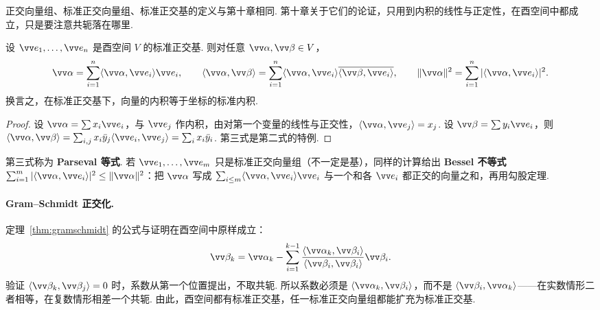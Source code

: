 	正交向量组、标准正交向量组、标准正交基的定义与第十章相同. 第十章关于它们的论证，只用到内积的线性与正定性，在酉空间中都成立，只是要注意共轭落在哪里.
	
	\begin{proposition}\label{prop:unitarycoord}
		设 $\vv e_1,\ldots,\vv e_n$ 是酉空间 $V$ 的标准正交基. 则对任意 $\vv\alpha,\vv\beta\in V$，
		\[\vv\alpha=\sum_{i=1}^n\langle\vv\alpha,\vv e_i\rangle\vv e_i,\qquad \langle\vv\alpha,\vv\beta\rangle=\sum_{i=1}^n\langle\vv\alpha,\vv e_i\rangle\overline{\langle\vv\beta,\vv e_i\rangle},\qquad\|\vv\alpha\|^2=\sum_{i=1}^n|\langle\vv\alpha,\vv e_i\rangle|^2.\]
		换言之，在标准正交基下，向量的内积等于坐标的标准内积.
	\end{proposition}
	\begin{proof}
		设 $\vv\alpha=\sum x_i\vv e_i$，与 $\vv e_j$ 作内积，由对第一个变量的线性与正交性，$\langle\vv\alpha,\vv e_j\rangle=x_j$. 设 $\vv\beta=\sum y_i\vv e_i$，则 $\langle\vv\alpha,\vv\beta\rangle=\sum_{i,j}x_i\bar y_j\langle\vv e_i,\vv e_j\rangle=\sum_ix_i\bar y_i$. 第三式是第二式的特例.
	\end{proof}
	
	第三式称为 \textbf{Parseval 等式}. 若 $\vv e_1,\ldots,\vv e_m$ 只是标准正交向量组（不一定是基），同样的计算给出 \textbf{Bessel 不等式} $\sum_{i=1}^m|\langle\vv\alpha,\vv e_i\rangle|^2\le\|\vv\alpha\|^2$：把 $\vv\alpha$ 写成 $\sum_{i\le m}\langle\vv\alpha,\vv e_i\rangle\vv e_i$ 与一个和各 $\vv e_i$ 都正交的向量之和，再用勾股定理.
	
	\paragraph*{Gram–Schmidt 正交化.} 定理~\ref{thm:gramschmidt} 的公式与证明在酉空间中原样成立：
	\[\vv\beta_k=\vv\alpha_k-\sum_{i=1}^{k-1}\frac{\langle\vv\alpha_k,\vv\beta_i\rangle}{\langle\vv\beta_i,\vv\beta_i\rangle}\vv\beta_i.\]
	验证 $\langle\vv\beta_k,\vv\beta_j\rangle=0$ 时，系数从第一个位置提出，不取共轭. 所以系数必须是 $\langle\vv\alpha_k,\vv\beta_i\rangle$，而不是 $\langle\vv\beta_i,\vv\alpha_k\rangle$——在实数情形二者相等，在复数情形相差一个共轭. 由此，酉空间都有标准正交基，任一标准正交向量组都能扩充为标准正交基.
	
